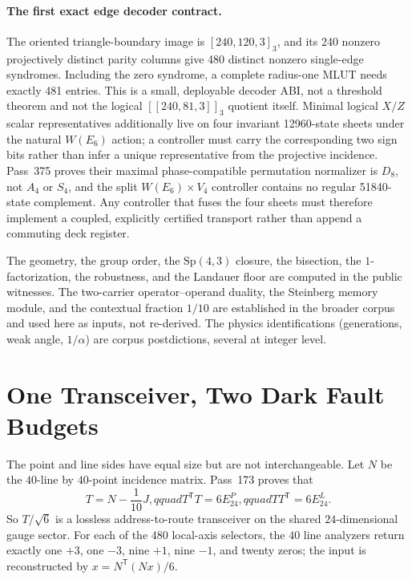 \documentclass[11pt]{article}
\begin{document}
\paragraph{The first exact edge decoder contract.}  The oriented triangle-boundary image is
$[240,120,3]_3$, and its 240 nonzero projectively distinct parity columns give 480 distinct nonzero
single-edge syndromes.  Including the zero syndrome, a complete radius-one MLUT needs exactly 481 entries.
This is a small, deployable decoder ABI, not a threshold theorem and not the logical
$[[240,81,3]]_3$ quotient itself.  Minimal logical $X/Z$ scalar representatives additionally live on four
invariant 12960-state sheets under the natural $W(E_6)$ action; a controller must carry the corresponding
two sign bits rather than infer a unique representative from the projective incidence.  Pass~375 proves their
maximal phase-compatible permutation normalizer is $D_8$, not $A_4$ or $S_4$, and the split
$W(E_6)\times V_4$ controller contains no regular 51840-state complement.  Any controller that fuses the four
sheets must therefore implement a coupled, explicitly certified transport rather than append a commuting deck
register.

\begin{honestbox}
The geometry, the group order, the $\mathrm{Sp}(4,3)$ closure, the bisection, the $1$-factorization,
the robustness, and the Landauer floor are computed in the public witnesses. The two-carrier
operator--operand duality, the Steinberg memory module, and the contextual fraction $1/10$ are
established in the broader corpus and used here as inputs, not re-derived. The physics identifications
(generations, weak angle, $1/\alpha$) are corpus postdictions, several at integer level.
\end{honestbox}

\section{One Transceiver, Two Dark Fault Budgets}
\label{sec:incidence-transceiver-dark-budgets}

The point and line sides have equal size but are not interchangeable.  Let $N$ be the $40$-line by
$40$-point incidence matrix.  Pass~173 proves that
\[
T=N-\frac1{10}J,qquad
T^{\mathsf T}T=6E_{24}^{P},qquad
TT^{\mathsf T}=6E_{24}^{L}.
\]
So $T/\sqrt6$ is a lossless address-to-route transceiver on the shared $24$-dimensional gauge sector.
For each of the $480$ local-axis selectors, the $40$ line analyzers return exactly one $+3$, one $-3$,
nine $+1$, nine $-1$, and twenty zeros; the input is reconstructed by $x=N^{\mathsf T}(Nx)/6$.
\end{document}
